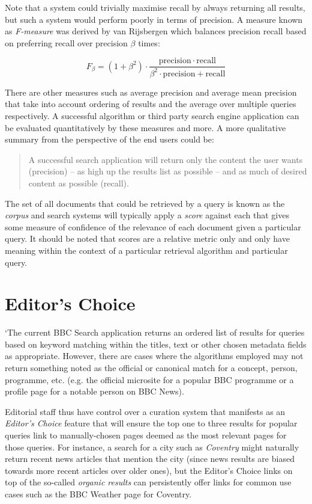 Note that a system could trivially maximise recall by always returning all
results, but such a system would perform poorly in terms of precision. A
measure known as \emph{F-measure} was derived by van Rijsbergen
\cite{rijsbergen1979information} which
balances precision recall based on preferring recall over precision $\beta$
times:

\begin{displaymath}
  F_\beta = (1 + \beta^2) \cdot \frac{\mathrm{precision} \cdot \mathrm{recall} }{ \beta^2 \cdot \mathrm{precision} + \mathrm{recall}}
\end{displaymath}

There are other measures such as average precision and average mean precision
that take into account ordering of results and the average over multiple
queries respectively. A successful algorithm or third party search engine
application can be evaluated quantitatively by these measures and more. A more
qualitative summary from the perspective of the end users could be:

\begin{quote}
  A successful search application will return only the content the user wants
  (precision) --
  as high up the results list as possible -- and as much of desired content
  as possible (recall).
\end{quote}

The set of all documents that could be retrieved by a query is known as the
\emph{corpus} and search systems will typically apply a \emph{score} against
each that gives some measure of confidence of the relevance of each document
given a particular query. It should be noted that scores are a relative
metric only and only have meaning within the context of a particular
retrieval algorithm and particular query.

\section{Editor's Choice}

`The current BBC Search application returns an ordered list of results
for queries based on keyword matching within the titles, text or other
chosen metadata fields as appropriate. However, there are cases where
the algorithms employed may not return something noted as the official
or canonical match for a concept, person, programme, etc. (e.g. the
official microsite for a popular BBC programme or a profile page for
a notable person on BBC News).

Editorial staff thus have control over a curation system that manifests
as an \emph{Editor's Choice} feature that will ensure the top one to three
results for popular queries link to manually-chosen pages deemed as the most
relevant pages for those queries. For instance, a search for a city such
as \emph{Coventry} might naturally return recent news articles that mention the
city (since news results are biased towards more recent articles over older
ones), but the Editor's Choice links on top of the so-called \emph{organic
results} can persistently offer links for common use cases such as
the BBC Weather page for Coventry.

